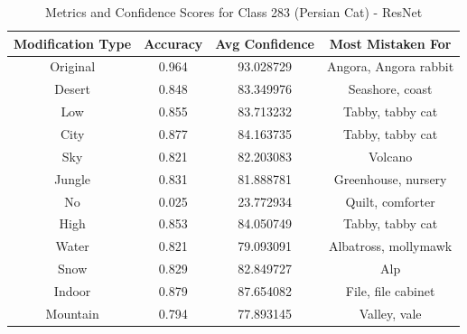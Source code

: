 \begin{table}
	\centering
	\begin{tabular}{|c|c|c|c|}
		\hline
		\textbf{Modification Type} & \textbf{Accuracy} & \textbf{Avg Confidence} & \textbf{Most Mistaken For} \\
		\hline
		Original & 0.964 & 93.028729 & Angora, Angora rabbit \\
		\hline
		Desert & 0.848 & 83.349976 & Seashore, coast \\
		\hline
		Low & 0.855 & 83.713232 & Tabby, tabby cat \\
		\hline
		City & 0.877 & 84.163735 & Tabby, tabby cat \\
		\hline
		Sky & 0.821 & 82.203083 & Volcano \\
		\hline
		Jungle & 0.831 & 81.888781 & Greenhouse, nursery \\
		\hline
		No & 0.025 & 23.772934 & Quilt, comforter \\
		\hline
		High & 0.853 & 84.050749 & Tabby, tabby cat \\
		\hline
		Water & 0.821 & 79.093091 & Albatross, mollymawk \\
		\hline
		Snow & 0.829 & 82.849727 & Alp \\
		\hline
		Indoor & 0.879 & 87.654082 & File, file cabinet \\
		\hline
		Mountain & 0.794 & 77.893145 & Valley, vale \\
		\hline
	\end{tabular}
	\caption{Metrics and Confidence Scores for Class 283 (Persian Cat) - ResNet}
	\label{tab:metrics_confidence_class_283_resnet}
\end{table}

